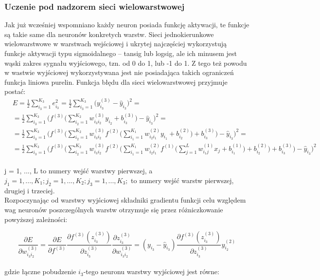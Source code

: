 \documentclass[a4paper, 12pt]{article}
\begin{document}
\newpage
\subsubsection{Uczenie pod nadzorem sieci wielowarstwowej}
Jak już wcześniej wspomniano każdy neuron posiada funkcję aktywacji, te funkcje są takie same dla neuronów konkretych warstw. Sieci jednokierunkowe wielowarstwowe w warstwach wejściowej i ukrytej najczęściej wykorzystują funkcje aktywacji typu sigmoidalnego – tansig lub logsig, ale ich minusem jest wąski zakres sygnału wyjściowego, tzn. od 0 do 1, lub -1 do 1. Z tego też powodu w wastwie wyjściowej wykorzystywana jest nie posiadająca takich ograniczeń funkcja liniowa purelin.
Funkcja błędu dla sieci wielowarstwowej przyjmuje postać:\\

\begin{equation}
	\begin{aligned}
	&E  = \frac{1}{2} {\sum_{i_3=1}^{K_3}  e^{2}_{i_3}} = \frac{1}{2} {\sum_{i_3=1}^{K_3}  \big( y^{(3)}_{i_3} - \widehat{y}_{i_3} \big)^2} =\\
	&= \frac{1}{2} {\sum_{i_3=1}^{K_3} \Big( f^{(3)} \Big( {\sum_{i_2=1}^{K_2}  w^{(3)}_{i_3 i_2}y_{i_2} + b^{(3)}_{i_3} }\Big) - \widehat{y}_{i_3} \Big)^2} =\\
	&= \frac{1}{2} {\sum_{i_3=1}^{K_3} \Big( f^{(3)} \Big( {\sum_{i_2=1}^{K_2}  w^{(3)}_{i_3 i_2}f^{(2)}\Big( {\sum_{i_1=1}^{K_1}  w^{(2)}_{i_2 i_1}y_{i_1} + b^{(2)}_{i_2} } \Big) + b^{(3)}_{i_3} }\Big) - \widehat{y}_{i_3} \Big)^2} =\\
	&= \frac{1}{2} {\sum_{i_3=1}^{K_3} \Big( f^{(3)} \Big( {\sum_{i_2=1}^{K_2}  w^{(3)}_{i_3 i_2}f^{(2)}\Big( {\sum_{i_1=1}^{K_1}  w^{(2)}_{i_2 i_1}f^{(1)} \Big( {\sum_{j=1}^{L} w^{(1)}_{i_1 j}x_j + b^{(1)}_{i_1} }  \Big) + b^{(2)}_{i_2} } \Big) + b^{(3)}_{i_3} }\Big) - \widehat{y}_{i_3} \Big)^2}
	\end{aligned}
\end{equation}\\
j = 1, ..., L to numery wejść warstwy pierwszej, a $j_1 = 1, ..., K_1;  j_2 = 1, ..., K_2;  j_3 = 1, ..., K_3; $ to numery wejść warstw pierwszej, drugiej i trzeciej.\\
Rozpoczynając od warstwy wyjściowej składniki gradientu funkcji celu względem wag neuronów poszczególnych warstw otrzymuje się przez różniczkowanie powyższej zależności:

\begin{equation}
\frac{\partial E}{\partial w_{i_{3} i_{2}}^{(3)}}=\frac{\partial E}{\partial f^{(3)}} \frac{\partial f^{(3)}\left(z_{i_{3}}^{(3)}\right)}{\partial z_{i_{3}}^{(3)}} \frac{\partial z_{i_{3}}^{(3)}}{\partial w_{i_{3} i_{2}}^{(3)}} = ( y_{i_3}-\hat{y}_{i_3} ) \frac{\partial f^{(3)}\left(z_{i_3}^{(3)}\right)}{\partial z_{i_{3}}^{(3)}} y^{(2)}_{i_2}
\label{Eq:2.28}
\end{equation}\\
gdzie łączne pobudzenie $i_3$-tego neuronu warstwy wyjściowej jest równe:
\end{document}
